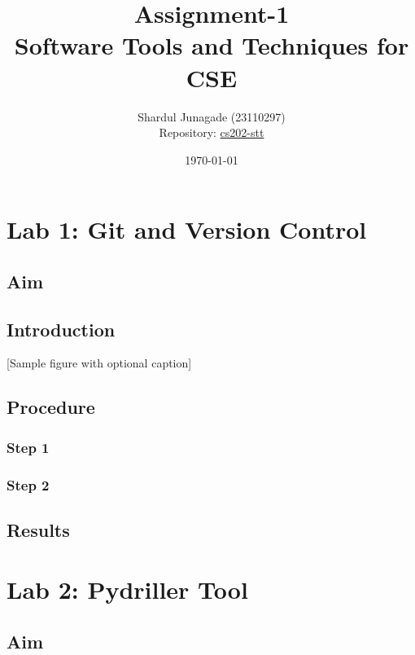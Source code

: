 \documentclass[10pt,a4paper]{report}
\title{\Huge Assignment-1 \\[0.5cm] \LARGE Software Tools and Techniques for CSE}
\author{\Large Shardul Junagade (23110297) \\[0.2cm] \Large Repository: \href{https://github.com/ShardulJunagade/cs202-stt}{cs202-stt}}
\date{\large \today}
\begin{document}
\maketitle
\newpage

\tableofcontents
\newpage

\chapter{Lab 1: Git and Version Control}
\section{Aim}
\lipsum[1]

\section{Introduction}
\lipsum[1]

[Sample figure with optional caption]

\section{Procedure}
\subsection{Step 1}
\lipsum[2]
\lipsum[2]


\subsection{Step 2}
\lipsum[3]

\section{Results}
\lipsum[4]

\chapter{Lab 2: Pydriller Tool}
\section{Aim}
\lipsum[5]
\end{document}
